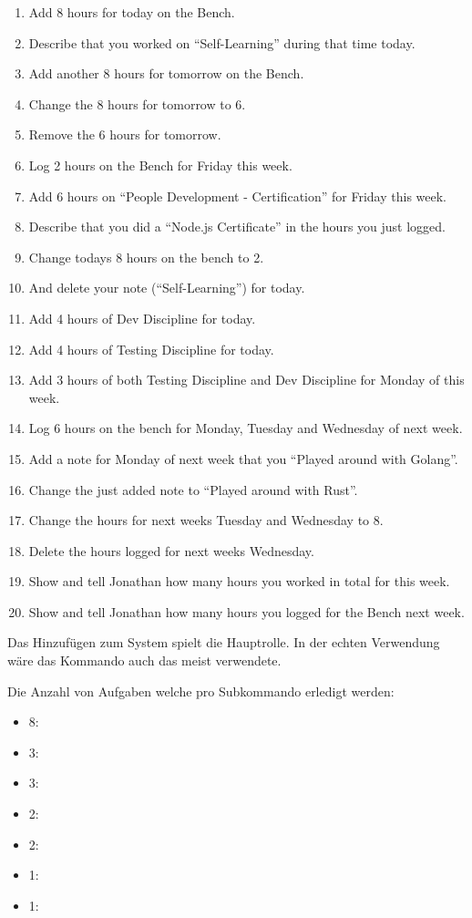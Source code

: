\documentclass[oneside,bibliography=totocnumbered,BCOR=5mm]{scrbook}
\begin{document}
\begin{enumerate}
  \item Add 8 hours for today on the Bench.
  \item Describe that you worked on ``Self-Learning'' during that time today.
  \item Add another 8 hours for tomorrow on the Bench.
  \item Change the 8 hours for tomorrow to 6.
  \item Remove the 6 hours for tomorrow.
  \item Log 2 hours on the Bench for Friday this week.
  \item Add 6 hours on ``People Development - Certification'' for Friday this week.
  \item Describe that you did a ``Node.js Certificate'' in the hours you just logged.
  \item Change todays 8 hours on the bench to 2.
  \item And delete your note (``Self-Learning'') for today.
  \item Add 4 hours of Dev Discipline for today.
  \item Add 4 hours of Testing Discipline for today.
  \item Add 3 hours of both Testing Discipline and Dev Discipline for Monday of this week.
  \item Log 6 hours on the bench for Monday, Tuesday and Wednesday of next week.
  \item Add a note for Monday of next week that you ``Played around with Golang''.
  \item Change the just added note to ``Played around with Rust''.
  \item Change the hours for next weeks Tuesday and Wednesday to 8.
  \item Delete the hours logged for next weeks Wednesday.
  \item Show and tell Jonathan how many hours you worked in total for this week.
  \item Show and tell Jonathan how many hours you logged for the Bench next week.
\end{enumerate}

Das Hinzufügen zum System spielt die Hauptrolle. In der echten Verwendung wäre
das  Kommando auch das meist verwendete.

\label{text:anzahl-aufgaben}
Die Anzahl von Aufgaben welche pro Subkommando erledigt werden:
\begin{itemize}
  \item 8: 
  \item 3: 
  \item 3: 
  \item 2: 
  \item 2: 
  \item 1: 
  \item 1: 
\end{itemize}
\end{document}
